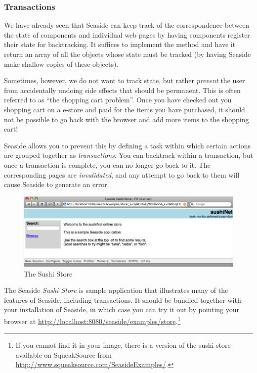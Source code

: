 \documentclass[a4paper,10pt,twoside]{book}
\begin{document}
\subsubsection{Transactions}

We have already seen that Seaside can keep track of the correspondence between the state of components and individual web pages by having components register their state for backtracking.
It suffices to implement the method  and have it return an array of all the objects whose state must be tracked (\ie by having Seaside make shallow copies of these objects).

Sometimes, however, we do not want to track state, but rather \emph{prevent} the user from accidentally undoing side effects that should be permanent.
This is often referred to as ``the shopping cart problem''.
Once you have checked out you shopping cart on a e-store and paid for the items you have purchased, it should not be possible to go back with the browser and add more items to the shopping cart!

Seaside allows you to prevent this by defining a task within which certain actions are grouped together as \emph{transactions}.
You can backtrack within a transaction, but once a transaction is complete, you can no longer go back to it.
The corresponding pages are \emph{invalidated}, and any attempt to go back to them will cause Seaside to generate an error.

\begin{figure}[ht]
\begin{center}
\includegraphics[width=\textwidth]{sushiStore}
\caption{The Sushi Store}
\label{fig:sushiStore}
\end{center}
\end{figure}

The Seaside \emph{Sushi Store} is sample application that illustrates many of the features of Seaside, including transactions.
It should be bundled together with your installation of Seaside, in which case you can try it out by pointing your browser at
\url{http://localhost:8080/seaside/examples/store}.\footnote{If you cannot find it in your image, there is a version of the sushi store available on SqueakSource from \url{http://www.squeaksource.com/SeasideExamples/}.}
\end{document}
